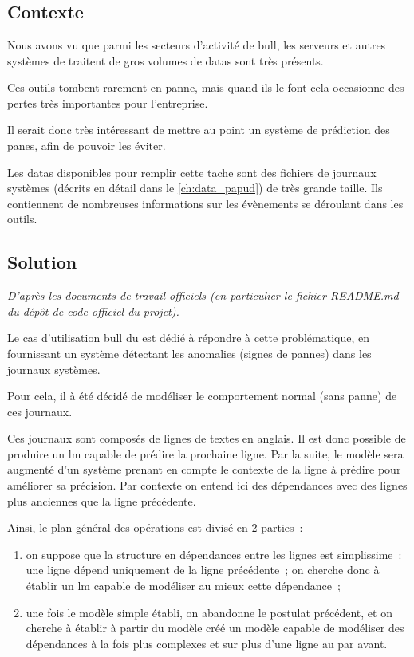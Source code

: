 \chapter{\label{ch:project_papud}}
\section{Contexte}
Nous avons vu que parmi les secteurs d'activité de \gls{bull}, les serveurs et autres systèmes de traitent de gros volumes de \glspl{data} sont très présents.

Ces outils tombent rarement en panne, mais quand ils le font cela occasionne des pertes très importantes pour l'entreprise.

Il serait donc très intéressant de mettre au point un système de prédiction des panes, afin de pouvoir les éviter.

Les \glspl{data} disponibles pour remplir cette tache sont des fichiers de journaux systèmes (décrits en détail dans le \autoref{ch:data_papud}) de très grande taille.
Ils contiennent de nombreuses informations sur les évènements se déroulant dans les outils.

\section{Solution}
\textit{D'après les documents de travail officiels (en particulier le fichier README.md du dépôt de code officiel du projet).} %

Le cas d'utilisation \gls{bull} du  est dédié à répondre à cette problématique, en fournissant un système détectant les anomalies (signes de pannes) dans les journaux systèmes.

Pour cela, il à été décidé de modéliser le comportement normal (sans panne) de ces journaux.

Ces journaux sont composés de lignes de textes en anglais. Il est donc possible de produire un \gls{lm} capable de prédire la prochaine ligne.
Par la suite, le modèle sera augmenté d'un système prenant en compte le contexte de la ligne à prédire pour améliorer sa précision.
Par contexte on entend ici des dépendances avec des lignes plus anciennes que la ligne précédente.

Ainsi, le plan général des opérations est divisé en 2 parties~:
\begin{enumerate}
	\item on suppose que la structure en dépendances entre les lignes est simplissime~: une ligne dépend uniquement de la ligne précédente~; on cherche donc à établir un \gls{lm} capable de modéliser au mieux cette dépendance~;
	\item une fois le modèle simple établi, on abandonne le postulat précédent, et on cherche à établir à partir du modèle créé un modèle capable de modéliser des dépendances à la fois plus complexes et sur plus d'une ligne au par avant.
\end{enumerate}
\hspace{1em}

